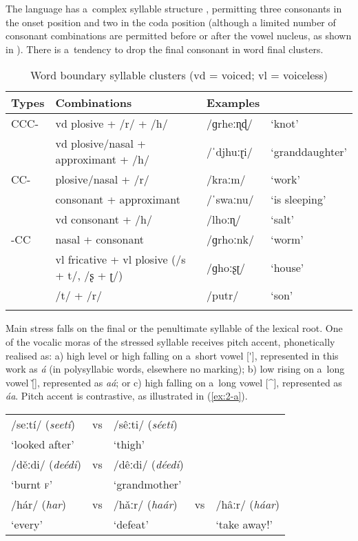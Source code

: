 The language has a~complex syllable structure \citep{maddieson_syllable_2013}, permitting three consonants in the onset position and two in the coda position (although a limited number of consonant combinations are permitted before or after the vowel nucleus, as shown in ). There is a~tendency to drop the final consonant in word final clusters.


\begin{table}[ht]
\caption{Word boundary syllable clusters (vd = voiced; vl = voiceless)}
\begin{tabularx}{\textwidth}{ l l l l}
\lsptoprule
Types &
Combinations &
Examples \\\hline
CCC- &
vd plosive + /r/ + /h/&
/ɡrheːɳɖ/ &
`knot'\\
&
vd plosive/nasal + approximant + /h/&
/ˈdjhuːɽi/ &
`granddaughter'\\
CC- &
plosive/nasal + /r/ &
/kraːm/ &
`work'\\
&
consonant + approximant &
/ˈswaːnu/ &
`is sleeping'\\
&
vd consonant + /h/ &
/lhoːɳ/ &
`salt'\\
-CC &
nasal + consonant &
/ɡrhoːnk/ &
`worm'\\
&
vl fricative + vl plosive (/s + t/, /ʂ + ʈ/) &
/ɡhoːʂʈ/ &
`house'\\
&
/t/ + /r/ &
/putr/ &
`son'\\\lspbottomrule
\end{tabularx}
\label{tab:2-clusters}
\end{table}


Main stress falls on the final or the penultimate syllable of the lexical root. One of the vocalic moras of the stressed
syllable receives pitch accent, phonetically realised as: a) high level or high falling on a~short vowel
[\'{}], represented in this work as \textit{á} (in polysyllabic words, elsewhere no marking); b)
low rising on a~long vowel [\v{}], represented as \textit{aá}; or c) high falling on a~long vowel [\^{}],
represented as \textit{áa}. Pitch accent is contrastive, as illustrated in (\ref{ex:2-a}).


\begin{exe}
\extab
\label{ex:2-a}
\begin{tabularx}{116mm}{ l l l l l }
/seːtí/ (\textit{seetí})  &
vs &
/sêːti/ (\textit{séeti}) \\
`looked after' &
&
`thigh' \\
/děːdi/ (\textit{deédi})  &
vs &
/dêːdi/ (\textit{déedi})  \\
`burnt \textsc{f}' &
&
`grandmother' \\
/hár/ (\textit{har})  &
vs &
/hǎːr/ (\textit{haár})  &
vs &
/hâːr/ (\textit{háar}) \\
`every' &
&
`defeat' &
&
`take away!'\\
\end{tabularx}
\end{exe}



